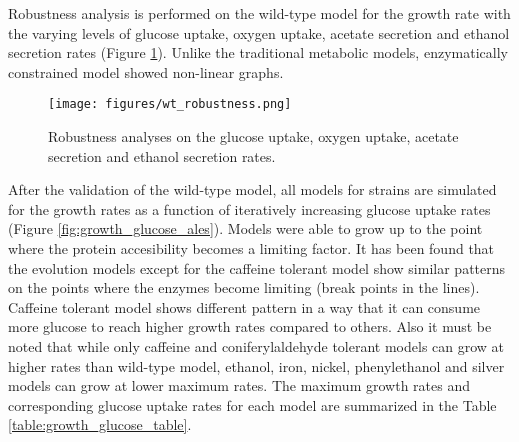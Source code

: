 Robustness analysis is performed on the wild-type model for the growth rate with the varying levels of glucose uptake, oxygen uptake, acetate secretion and ethanol secretion rates (Figure \ref{fig:wt_robustness}). Unlike the traditional metabolic models, enzymatically constrained model showed non-linear graphs.

\begin{figure}[H]
\begin{center}
\texttt{[image: figures/wt\_robustness.png]}
\caption[Robustness analyses on the glucose uptake, oxygen uptake, acetate secretion and ethanol secretion rates]{Robustness analyses on the glucose uptake, oxygen uptake, acetate secretion and ethanol secretion rates.}
\end{center}
\label{fig:wt_robustness}
\end{figure}



After the validation of the wild-type model, all models for strains are simulated for the growth rates as a function of iteratively increasing glucose uptake rates (Figure \ref{fig:growth_glucose_ales}). Models were able to grow up to the point where the protein accesibility becomes a limiting factor. It has been found that the evolution models except for the caffeine tolerant model show similar patterns on the points where the enzymes become limiting (break points in the lines). Caffeine tolerant model shows different pattern in a way that it can consume more glucose to reach higher growth rates compared to others. Also it must be noted that while only caffeine and coniferylaldehyde tolerant models can grow at higher rates than wild-type model, ethanol, iron, nickel, phenylethanol and silver models can grow at lower maximum rates. The maximum growth rates and corresponding glucose uptake rates for each model are summarized in the Table \ref{table:growth_glucose_table}.

